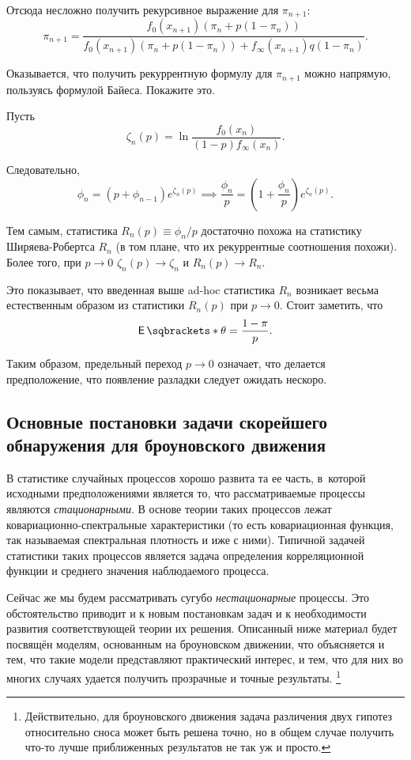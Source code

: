 Отсюда несложно получить рекурсивное выражение для \(\pi_{n + 1}\):
\[
	\pi_{n + 1} = \frac{f_{0}(x_{n + 1})(\pi_{n} + p(1 - \pi_{n}))}{f_{0}(x_{n + 1})(\pi_{n} + p(1 - \pi_{n})) + f_{\infty}(x_{n + 1})q(1 - \pi_{n})}.
\]

\begin{exercise}
	Оказывается, что получить рекуррентную формулу для \(\pi_{n + 1}\) можно напрямую, пользуясь формулой Байеса. Покажите это.
\end{exercise}

Пусть
\[
	\zeta_{n}(p)
	= \ln \frac{f_{0}(x_{n})}{(1 - p)f_{\infty}(x_{n})}.
\]

Следовательно,
\[
	\phi_{n}
	= (p + \phi_{n - 1})e^{\zeta_{n}(p)} 
	\implies 
	\frac{\phi_{n}}{p} 
	= \left(1 + \frac{\phi_{n}}{p}\right)e^{\zeta_{n}(p)}.
\]

Тем самым, статистика \(R_{n}(p) \equiv \phi_{n}/p\) достаточно похожа на статистику Ширяева-Робертса \(R_{n}\) (в том плане, что их рекуррентные соотношения похожи). 
Более того, при \(p \to 0\) \(\zeta_{n}(p) \to \zeta_{n}\) и \(R_{n}(p) \to R_{n}\).

Это показывает, что введенная выше ad-hoc статистика \(R_{n}\) возникает весьма естественным образом из статистики \(R_{n}(p)\) при \(p \to 0\). 
Стоит заметить, что
\[
	\E{\theta} = \frac{1 - \pi}{p}.
\]

Таким образом, предельный переход \(p \to 0\) означает, что делается предположение, что появление разладки следует ожидать нескоро.

\subsection{Основные постановки задачи скорейшего обнаружения для броуновского движения}

В статистике случайных процессов хорошо развита та ее часть, в~которой исходными предположениями является то, что
рассматриваемые процессы являются \emph{стационарными}.
В основе теории таких процессов лежат ковариационно-спектральные характеристики (то есть ковариационная функция, так называемая спектральная плотность и иже с ними).
Типичной задачей статистики таких процессов является задача определения корреляционной функции и среднего значения наблюдаемого процесса.

Сейчас же мы будем рассматривать сугубо \emph{нестационарные} процессы. 
Это обстоятельство приводит и к новым постановкам задач и к необходимости развития соответствующей теории их решения.
Описанный ниже материал будет посвящён моделям, основанным на броуновском движении, что объясняется и тем, что такие модели представляют практический интерес, и тем, что для них во многих случаях удается получить прозрачные и точные результаты.%
\footnote{Действительно, для броуновского движения задача различения двух гипотез относительно сноса может быть решена точно, но в общем случае получить что-то лучше приближенных результатов не так уж и просто.}

